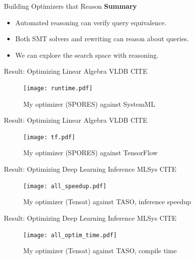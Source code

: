 \documentclass{beamer}
\begin{document}
  \begin{frame}{Building Optimizers that Reason}
    \textbf{Summary}
    \begin{itemize}
      \item Automated reasoning can verify query equivalence.
      \item Both SMT solvers and rewriting can reason about queries.
      \item We can explore the search space with reasoning.
    \end{itemize}
  \end{frame}

  \begin{frame}{Result: Optimizing Linear Algebra}
    VLDB CITE
    \begin{figure}
        \texttt{[image: runtime.pdf]}
        \caption*{My optimizer (SPORES) against SystemML}
    \end{figure}
  \end{frame}

  \begin{frame}{Result: Optimizing Linear Algebra}
    VLDB CITE
    \begin{figure}
      \texttt{[image: tf.pdf]}
      \caption*{My optimizer (SPORES) against TensorFlow}
    \end{figure}
  \end{frame}

  \begin{frame}{Result: Optimizing Deep Learning Inference}
    MLSys CITE
    \begin{figure}
      \texttt{[image: all\_speedup.pdf]}
      \caption*{My optimizer (Tensat) against TASO, inference speedup}
    \end{figure}
  \end{frame}

  \begin{frame}{Result: Optimizing Deep Learning Inference}
    MLSys CITE
    \begin{figure}
      \texttt{[image: all\_optim\_time.pdf]}
      \caption*{My optimizer (Tensat) against TASO, compile time}
    \end{figure}
  \end{frame}
  
\end{document}
